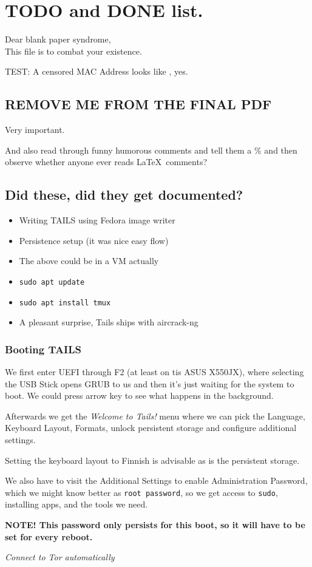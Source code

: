 \documentclass[../wifi-security.tex]{subfiles}
\begin{document}
\chapter{TODO and DONE list.}

Dear blank paper syndrome,\\This file is to combat your existence.

TEST: A censored MAC Address looks like \MACADDR, yes.

\section*{REMOVE ME FROM THE FINAL PDF}

Very important.

And also read through funny humorous comments and tell them a \% and then observe whether anyone ever reads \LaTeX\ comments?

\section*{Did these, did they get documented?}

\begin{itemize}
	\item{Writing TAILS using Fedora image writer}
	\item{Persistence setup (it was nice easy flow)}
	\item{The above could be in a VM actually}
	\item{\texttt{sudo apt update}}
	\item{\texttt{sudo apt install tmux}}
	\item{A pleasant surprise, Tails ships with aircrack-ng}
\end{itemize}

\subsection*{Booting TAILS}

We first enter UEFI through F2 (at least on tis ASUS X550JX), where selecting the USB Stick opens GRUB to us and then it's just waiting for the system to boot. We could press arrow key to see what happens in the background.


Afterwards we get the \textit{Welcome to Tails!} menu where we can pick the Language, Keyboard Layout, Formats, unlock persistent storage and configure additional settings.

Setting the keyboard layout to Finnish is advisable as is the persistent storage.

We also have to visit the Additional Settings to enable Administration Password, which we might know better as \texttt{root password}, so we get access to \texttt{sudo}, installing apps, and the tools we need.

\textbf{NOTE! This password only persists for this boot, so it will have to be set for every reboot.}

\textit{Connect to Tor automatically}
\end{document}
